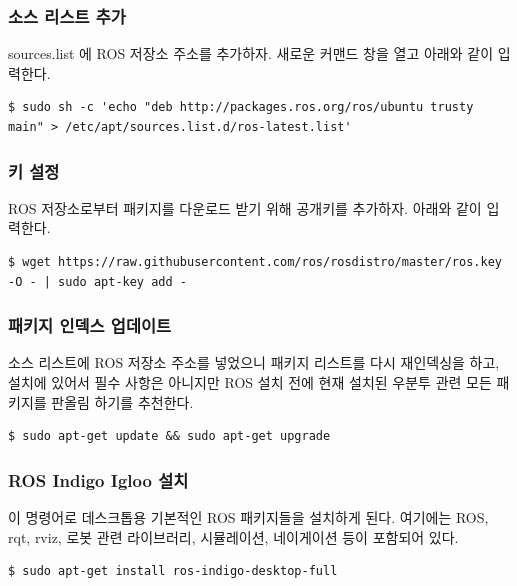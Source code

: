 \subsubsection{소스 리스트 추가}
sources.list 에 ROS 저장소 주소를 추가하자. 새로운 커맨드 창을 열고 아래와 같이 입력한다.
\\
\begin{lstlisting}[language=ROS]
$ sudo sh -c 'echo "deb http://packages.ros.org/ros/ubuntu trusty main" > /etc/apt/sources.list.d/ros-latest.list'
\end{lstlisting}

\subsubsection{키 설정}
ROS 저장소로부터 패키지를 다운로드 받기 위해 공개키를 추가하자. 아래와 같이 입력한다.
\\
\begin{lstlisting}[language=ROS]
$ wget https://raw.githubusercontent.com/ros/rosdistro/master/ros.key -O - | sudo apt-key add -
\end{lstlisting}

\subsubsection{패키지 인덱스 업데이트}
소스 리스트에 ROS 저장소 주소를 넣었으니 패키지 리스트를 다시 재인덱싱을 하고, 설치에 있어서 필수 사항은 아니지만 ROS 설치 전에 현재 설치된 우분투 관련 모든 패키지를 판올림 하기를 추천한다.
\\
\begin{lstlisting}[language=ROS]
$ sudo apt-get update && sudo apt-get upgrade
\end{lstlisting}

\subsubsection{ROS Indigo Igloo 설치}
이 명령어로 데스크톱용 기본적인 ROS 패키지들을 설치하게 된다. 여기에는 ROS, rqt, rviz, 로봇 관련 라이브러리, 시뮬레이션, 네이게이션 등이 포함되어 있다.
\\
\begin{lstlisting}[language=ROS]
$ sudo apt-get install ros-indigo-desktop-full
\end{lstlisting}

